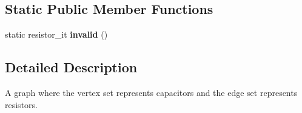 \subsection*{Static Public Member Functions}
\begin{DoxyCompactItemize}
\item 
\hypertarget{classophidian_1_1interconnection_1_1rc__tree_aa4187806724136382911946a0112ccf4}{static resistor\-\_\-it {\bfseries invalid} ()}\label{classophidian_1_1interconnection_1_1rc__tree_aa4187806724136382911946a0112ccf4}

\end{DoxyCompactItemize}


\subsection{Detailed Description}
A graph where the vertex set represents capacitors and the edge set represents resistors. 

